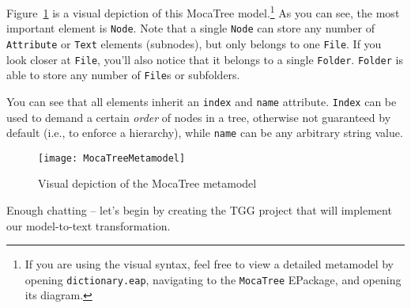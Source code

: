 Figure~\ref{mocaTreeMetamodel} is a visual depiction of this MocaTree model.\footnote{If you are using the visual syntax, feel free to view a detailed metamodel
by opening \texttt{dictionary.eap}, navigating to the \texttt{MocaTree} EPackage, and opening its diagram.} As you can see, the most important element is
\texttt{Node}. Note that a single \texttt{Node} can store any number of \texttt{Attribute} or \texttt{Text} elements (subnodes), but only belongs to one
\texttt{File}. If you look closer at \texttt{File}, you'll also notice that it belongs to a single \texttt{Folder}. \texttt{Folder} is able to store any number
of \texttt{File}s or subfolders.

You can see that all elements inherit an \texttt{index} and \texttt{name} attribute. \texttt{Index} can be used to demand a certain \emph{order}
of nodes in a tree, otherwise not guaranteed by default (i.e., to enforce a hierarchy), while \texttt{name} can be any arbitrary string value. 

\vspace{1cm}

\begin{figure}[htbp]
  \begin{centering}
  \texttt{[image: MocaTreeMetamodel]}
  \caption{Visual depiction of the MocaTree metamodel}
  \label{mocaTreeMetamodel}
  \end{centering}
\end{figure}

\vspace{1cm}

Enough chatting -- let's begin by creating the TGG project that will implement our model-to-text transformation.

\newpage





